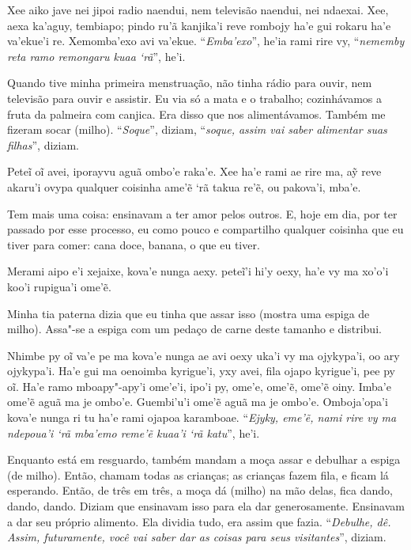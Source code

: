 \begin{paracol}{2}
\footnotesize
Xee aiko jave nei jipoi radio naendui, nem televisão naendui, nei
ndaexai. Xee, aexa ka'aguy, tembiapo; pindo ru'ã kanjika'i reve rombojy
ha'e gui rokaru ha'e va'ekue'i re. Xemomba'exo avi va'ekue.
``\emph{Emba'exo}'', he'ia rami rire vy, ``\emph{nememby reta ramo
remongaru kuaa `rã}'', he'i.  

\switchcolumn
Quando tive minha primeira menstruação, não tinha rádio para ouvir, nem
televisão para ouvir e assistir. Eu via só a mata e o trabalho;
cozinhávamos a fruta da palmeira com canjica. Era disso que nos
alimentávamos. Também me fizeram socar (milho). ``\emph{Soque}'',
diziam, ``\emph{soque, assim vai saber alimentar suas filhas}'', diziam.

\switchcolumn
Peteĩ oĩ avei, iporayvu aguã ombo'e raka'e. Xee ha'e rami ae rire ma, aỹ
reve akaru'i ovypa qualquer coisinha ame'ẽ `rã takua re'ẽ, ou pakova'i,
mba'e.

\switchcolumn
Tem mais uma coisa: ensinavam a ter amor pelos outros. E, hoje em dia,
por ter passado por esse processo, eu como pouco e compartilho qualquer
coisinha que eu tiver para comer: cana doce, banana, o que eu tiver. 

\switchcolumn
Merami aipo e'i xejaixe, kova'e nunga aexy. peteĩ'i hi'y oexy, ha'e vy
ma xo'o'i koo'i rupigua'i ome'ẽ.

\switchcolumn
Minha tia paterna dizia que eu tinha que assar isso (mostra uma espiga
de milho). Assa"-se a espiga com um pedaço de carne deste tamanho e
distribui.

\switchcolumn
Nhimbe py oĩ va'e pe ma kova'e nunga ae avi oexy uka'i vy ma ojykypa'i,
oo ary ojykypa'i. Ha'e gui ma oenoimba kyrigue'i, yxy avei, fila ojapo
kyrigue'i, pee py oĩ. Ha'e ramo mboapy"-apy'i ome'e'i, ipo'i py, ome'e,
ome'ẽ, ome'ẽ oiny. Imba'e ome'ẽ aguã ma je ombo'e. Guembi'u'i ome'ẽ aguã
ma je ombo'e. Omboja'opa'i kova'e nunga ri tu ha'e rami ojapoa
karamboae. ``\emph{Ejyky, eme'ẽ, nami rire vy ma ndepoua'i `rã mba'emo
reme'ẽ kuaa'i `rã katu}'', he'i.

\switchcolumn
Enquanto está em resguardo, também mandam a moça assar e debulhar a
espiga (de milho). Então, chamam todas as crianças; as crianças fazem
fila, e ficam lá esperando. Então, de três em três, a moça dá (milho) na
mão delas, fica dando, dando, dando. Diziam que ensinavam isso para ela
dar generosamente. Ensinavam a dar seu próprio alimento. Ela dividia
tudo, era assim que fazia. ``\emph{Debulhe, dê. Assim, futuramente, você
vai saber dar as coisas para seus visitantes}'', diziam. 


\end{paracol}
